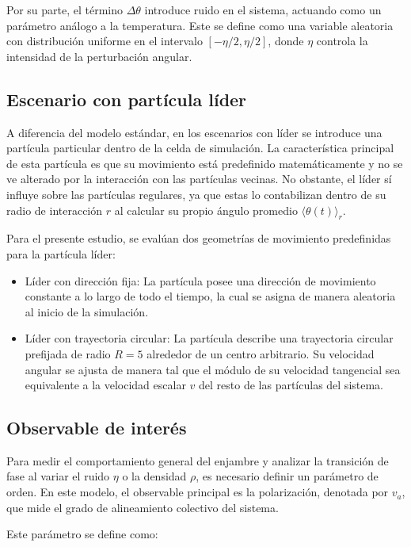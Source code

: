 \documentclass[a4paper,12pt]{article}
\begin{document}
Por su parte, el término $\Delta \theta$ introduce ruido en el sistema, actuando como un parámetro análogo a la temperatura. Este se define como una variable aleatoria con distribución uniforme en el intervalo $[-\eta/2,\eta/2]$, donde $\eta$ controla la intensidad de la perturbación angular.

\subsection{Escenario con partícula líder}

A diferencia del modelo estándar, en los escenarios con líder se introduce una partícula particular dentro de la celda de simulación. La característica principal de esta partícula es que su movimiento está predefinido matemáticamente y no se ve alterado por la interacción con las partículas vecinas. No obstante, el líder sí influye sobre las partículas regulares, ya que estas lo contabilizan dentro de su radio de interacción $r$ al calcular su propio ángulo promedio $\langle \theta(t) \rangle_r$.

Para el presente estudio, se evalúan dos geometrías de movimiento predefinidas para la partícula líder:

\begin{itemize}
	\item Líder con dirección fija: La partícula posee una dirección de movimiento constante a lo largo de todo el tiempo, la cual se asigna de manera aleatoria al inicio de la simulación.
	\item Líder con trayectoria circular: La partícula describe una trayectoria circular prefijada de radio $R=5$ alrededor de un centro arbitrario. Su velocidad angular se ajusta de manera tal que el módulo de su velocidad tangencial sea equivalente a la velocidad escalar $v$ del resto de las partículas del sistema.
\end{itemize}

\subsection{Observable de interés}

Para medir el comportamiento general del enjambre y analizar la transición de fase al variar el ruido $\eta$ o la densidad $\rho$, es necesario definir un parámetro de orden. En este modelo, el observable principal es la polarización, denotada por $v_a$, que mide el grado de alineamiento colectivo del sistema.

Este parámetro se define como:
\end{document}
